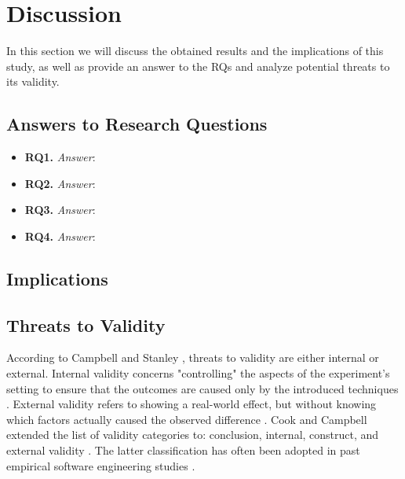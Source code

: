 \chapter{Discussion}
In this section we will discuss the obtained results and the implications of this study, as well as provide an answer to the RQs and analyze potential threats to its validity.

\section{Answers to Research Questions}
\begin{itemize}
    \item \textbf{RQ1.}
    \textit{Answer}:

    \item \textbf{RQ2.}
    \textit{Answer}:

    \item \textbf{RQ3.}
    \textit{Answer}:
    
    \item \textbf{RQ4.}
    \textit{Answer}:
\end{itemize}


\section{Implications}



\section{Threats to Validity}
According to Campbell and Stanley \cite{ResearchOfTeaching}, threats to validity are either internal or external. Internal validity concerns "controlling" the aspects of the experiment's setting to ensure that the outcomes are caused only by the introduced techniques \cite{DBLP:conf/icse/SiegmundSA15}. External validity refers to showing a real-world effect, but without knowing which factors actually caused the observed difference \cite{DBLP:conf/icse/SiegmundSA15}.
Cook and Campbell extended the list of validity categories to: conclusion, internal, construct, and external validity \cite{QuasiExp}. The latter classification has often been adopted in past empirical software engineering studies \cite{DBLP:books/sp/WohlinRHOR00}. 


